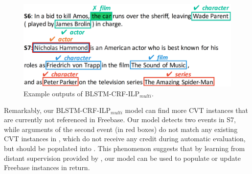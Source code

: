 \begin{figure}[h]
	\centering
	\includegraphics[width=.48\textwidth]{figure3(2).png}
	\caption{Example outputs of BLSTM-CRF-ILP$_{multi}$.\label{fig:1}}
\end{figure}




Remarkably, our BLSTM-CRF-ILP$_{multi}$ model can find more CVT instances that are currently not referenced in Freebase. Our model detects two events in S7, while arguments of the second event (in red boxes) do not match any existing CVT instances in \FB, which do not receive any credit during automatic evaluation, but should be populated into \FB. %
This phenomenon suggests that by learning from distant supervision provided by \FB, our model can be used to populate or update Freebase instances in return.

